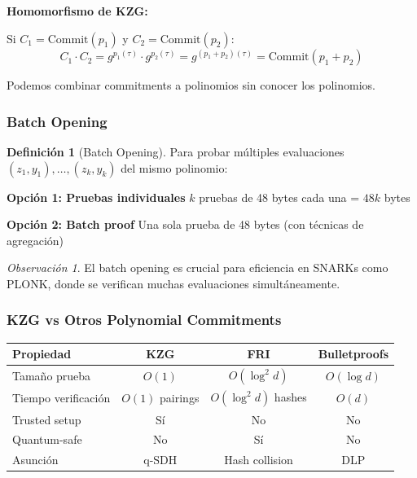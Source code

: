 \documentclass[11pt,a4paper,twoside,openright]{book}
\theoremstyle{definition}
\newtheorem{definition}{Definición}[chapter]
\theoremstyle{plain}
\theoremstyle{remark}
\newtheorem{remark}{Observación}[chapter]
\begin{document}
\begin{keyidea}
\textbf{Homomorfismo de KZG:}

Si $C_1 = \text{Commit}(p_1)$ y $C_2 = \text{Commit}(p_2)$:
\[ C_1 \cdot C_2 = g^{p_1(\tau)} \cdot g^{p_2(\tau)} = g^{(p_1 + p_2)(\tau)} = \text{Commit}(p_1 + p_2) \]

Podemos combinar commitments a polinomios sin conocer los polinomios.
\end{keyidea}

\subsubsection{Batch Opening}

\begin{definition}[Batch Opening]
Para probar múltiples evaluaciones $(z_1, y_1), \ldots, (z_k, y_k)$ del mismo polinomio:

\textbf{Opción 1: Pruebas individuales}
$k$ pruebas de 48 bytes cada una = $48k$ bytes

\textbf{Opción 2: Batch proof}
Una sola prueba de 48 bytes (con técnicas de agregación)
\end{definition}

\begin{remark}
El batch opening es crucial para eficiencia en SNARKs como PLONK, donde se verifican muchas evaluaciones simultáneamente.
\end{remark}

\subsubsection{KZG vs Otros Polynomial Commitments}

\begin{center}
\begin{tabular}{lccc}
\toprule
\textbf{Propiedad} & \textbf{KZG} & \textbf{FRI} & \textbf{Bulletproofs} \\
\midrule
Tamaño prueba & $O(1)$ & $O(\log^2 d)$ & $O(\log d)$ \\
Tiempo verificación & $O(1)$ pairings & $O(\log^2 d)$ hashes & $O(d)$ \\
Trusted setup & Sí & No & No \\
Quantum-safe & No & Sí & No \\
Asunción & q-SDH & Hash collision & DLP \\
\bottomrule
\end{tabular}
\end{center}
\end{document}
